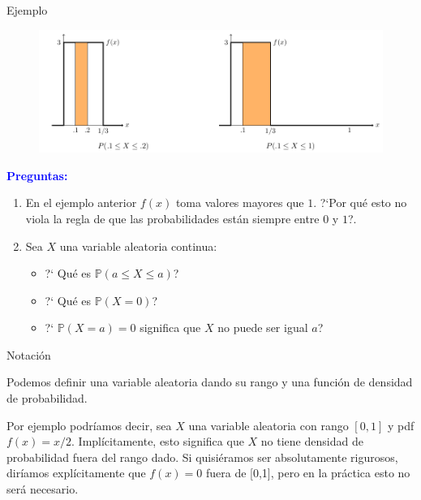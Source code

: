 \documentclass[10pt]{beamer}
\begin{document}
\begin{frame}{Ejemplo}
	\small{
\begin{figure}[ht]
	\centering
	\includegraphics[scale=.27]{G5.png}
	
\end{figure}

\textcolor{blue}{\textbf{Preguntas:}}

\begin{enumerate}
\item En el ejemplo anterior $f(x)$ toma valores mayores que $1$. ?`Por qu\'e esto no viola la regla de que las probabilidades est\'an siempre entre $0$ y $1$?.

\item Sea $X$ una variable aleatoria continua:

\begin{itemize}
	\item ?` Qu\'e es $\mathbb{P}(a \leq X \leq a)$?
	\item ?` Qu\'e es $\mathbb{P}(X = 0)$?
	\item ?` $\mathbb{P}(X = a) = 0$ significa que $X$ no puede ser igual $a$?
\end{itemize}
\end{enumerate}
}

\end{frame}

\begin{frame}{Notaci\'on}
\small{ Podemos definir una variable aleatoria dando su rango y una funci\'on de densidad de probabilidad.

\vspace{0.2cm}
		
Por ejemplo podr\'iamos decir, sea $X$ una variable aleatoria con rango $[0,1]$ y pdf $f(x) = x/2$. Impl\'icitamente, esto significa que $X$ no tiene densidad de probabilidad fuera del rango dado. Si quisi\'eramos ser absolutamente rigurosos, dir\'iamos expl\'icitamente que $f(x) = 0$ fuera de [0,1], pero en la pr\'actica esto no ser\'a necesario.
}

\vspace{2.8cm}


\end{frame}
\end{document}
